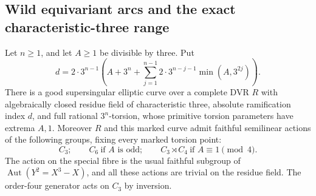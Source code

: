 \subsection{Wild equivariant arcs and the exact characteristic-three range}

\begin{lemma}
\label{lem:B-RD26-trace-arc}
Let $n\geq1$, and let $A\geq1$ be divisible by three. Put
\[
 d=2\cdot3^{n-1}\left(A+3^n+
        \sum_{j=1}^{n-1}2\cdot3^{n-j-1}\min(A,3^{2j})\right).
                                                        \tag{B-RD26.1}
\]
There is a good supersingular elliptic curve over a complete DVR
$R$ with algebraically closed residue field of characteristic three,
absolute ramification index $d$, and full rational $3^n$-torsion,
whose primitive torsion parameters have extrema $A,1$.
Moreover $R$ and this marked curve admit faithful semilinear actions
of the following groups, fixing every marked torsion point:
\[
 C_3;\qquad C_6\ \text{if }A\text{ is odd};\qquad
 C_3\rtimes C_4\ \text{if }A\equiv1\pmod4.
\]
The action on the special fibre is the usual faithful subgroup of
$\operatorname{Aut}(Y^2=X^3-X)$, and all these actions are trivial
on the residue field. The order-four generator acts on $C_3$ by
inversion.
\end{lemma}

